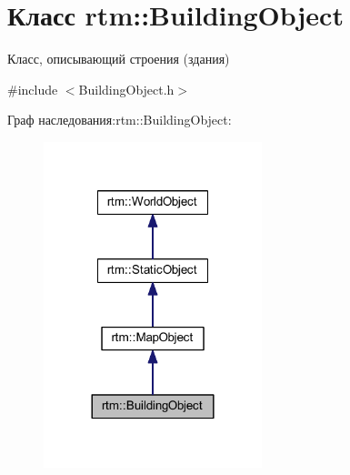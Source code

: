 \hypertarget{classrtm_1_1_building_object}{}\section{Класс rtm\+:\+:Building\+Object}
\label{classrtm_1_1_building_object}


Класс, описывающий строения (здания)  




{\ttfamily \#include $<$Building\+Object.\+h$>$}



Граф наследования\+:rtm\+:\+:Building\+Object\+:
\nopagebreak
\begin{figure}[H]
\begin{center}
\leavevmode
\includegraphics[width=180pt]{classrtm_1_1_building_object__inherit__graph}
\end{center}
\end{figure}
